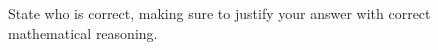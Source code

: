 \documentclass[a4paper,addpoints]{exam}
\begin{document}
\begin{questions}
\begin{parts}
            State who is correct, making sure to justify your answer with correct mathematical reasoning.
    \end{parts}
\end{questions}
\end{document}
